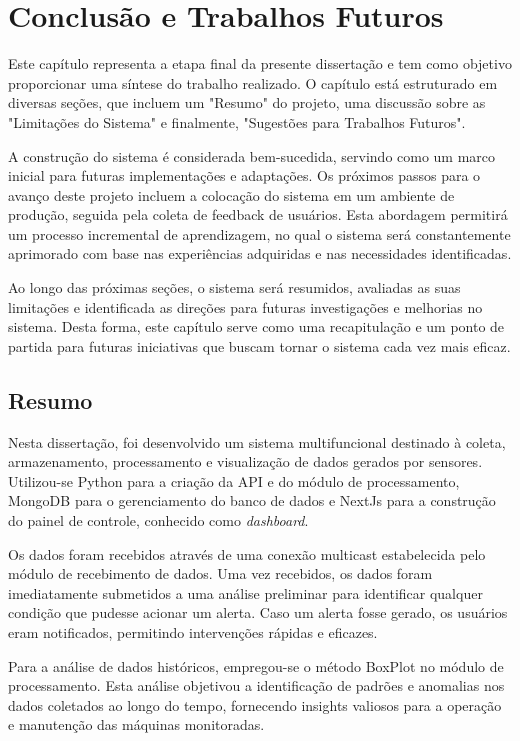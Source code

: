\chapter{Conclusão e Trabalhos Futuros}\label{chap:conclusion_and_future_work}

Este capítulo representa a etapa final da presente dissertação e tem como objetivo proporcionar uma síntese do trabalho realizado. O capítulo está estruturado em diversas seções, que incluem um "Resumo" do projeto, uma discussão sobre as "Limitações do Sistema" e finalmente, "Sugestões para Trabalhos Futuros". 

A construção do sistema é considerada bem-sucedida, servindo como um marco inicial para futuras implementações e adaptações. Os próximos passos para o avanço deste projeto incluem a colocação do sistema em um ambiente de produção, seguida pela coleta de feedback de usuários. Esta abordagem permitirá um processo incremental de aprendizagem, no qual o sistema será constantemente aprimorado com base nas experiências adquiridas e nas necessidades identificadas. 

Ao longo das próximas seções, o sistema será resumidos, avaliadas as suas limitações e identificada as direções para futuras investigações e melhorias no sistema. Desta forma, este capítulo serve como uma recapitulação e um ponto de partida para futuras iniciativas que buscam tornar o sistema cada vez mais eficaz.


\section{Resumo}\label{sec:summary}

Nesta dissertação, foi desenvolvido um sistema multifuncional destinado à coleta, armazenamento, processamento e visualização de dados gerados por sensores. Utilizou-se Python para a criação da API e do módulo de processamento, MongoDB para o gerenciamento do banco de dados e NextJs para a construção do painel de controle, conhecido como \emph{dashboard}.

Os dados foram recebidos através de uma conexão multicast estabelecida pelo módulo de recebimento de dados. Uma vez recebidos, os dados foram imediatamente submetidos a uma análise preliminar para identificar qualquer condição que pudesse acionar um alerta. Caso um alerta fosse gerado, os usuários eram notificados, permitindo intervenções rápidas e eficazes.

Para a análise de dados históricos, empregou-se o método BoxPlot no módulo de processamento. Esta análise objetivou a identificação de padrões e anomalias nos dados coletados ao longo do tempo, fornecendo insights valiosos para a operação e manutenção das máquinas monitoradas.

